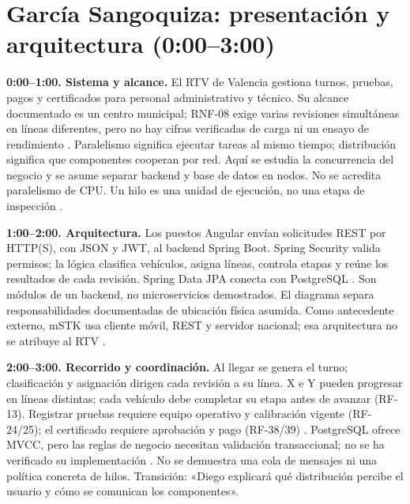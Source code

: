 \section*{García Sangoquiza: presentación y arquitectura (0:00--3:00)}
\textbf{0:00--1:00. Sistema y alcance.}
El RTV de Valencia gestiona turnos, pruebas, pagos y certificados para personal
administrativo y técnico. Su alcance documentado es un centro municipal;
RNF-08 exige varias revisiones simultáneas en líneas diferentes, pero no hay
cifras verificadas de carga ni un ensayo de rendimiento \cite{gs_rtv}.
Paralelismo significa ejecutar tareas al mismo tiempo; distribución significa
que componentes cooperan por red. Aquí se estudia la concurrencia del negocio
y se asume separar backend y base de datos en nodos. No se acredita paralelismo
de CPU. Un hilo es una unidad de ejecución, no una etapa de inspección
\cite{gs_oracle_hilos}.

\textbf{1:00--2:00. Arquitectura.}
Los puestos Angular envían solicitudes REST por HTTP(S), con JSON y JWT,
al backend Spring Boot. Spring Security valida permisos; la lógica clasifica
vehículos, asigna líneas, controla etapas y reúne los resultados de cada revisión.
Spring Data JPA conecta con PostgreSQL \cite{gs_rtv,gs_spring_servlet}.
Son módulos de un backend, no microservicios demostrados. El diagrama separa
responsabilidades documentadas de ubicación física asumida. Como antecedente
externo, mSTK usa cliente móvil, REST y servidor nacional; esa arquitectura
no se atribuye al RTV \cite[\S\,2.1, p.\,8]{gs_tapak2023}.

\textbf{2:00--3:00. Recorrido y coordinación.}
Al llegar se genera el turno; clasificación y asignación dirigen cada revisión
a su línea. X e Y pueden progresar en líneas distintas; cada vehículo debe
completar su etapa antes de avanzar (RF-13). Registrar pruebas requiere equipo
operativo y calibración vigente (RF-24/25); el certificado requiere aprobación
y pago (RF-38/39) \cite{gs_rtv}. PostgreSQL ofrece MVCC, pero las reglas de
negocio necesitan validación transaccional; no se ha verificado su implementación
\cite{gs_postgresql17}. No se demuestra una cola de mensajes ni una política
concreta de hilos. Transición: «Diego explicará qué distribución percibe el
usuario y cómo se comunican los componentes».
